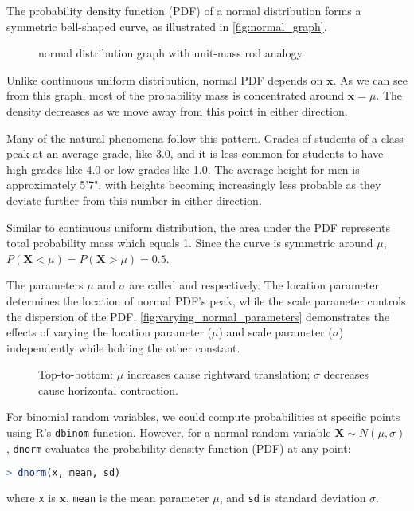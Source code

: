 The probability density function (PDF) of a normal distribution forms a symmetric bell-shaped curve, as illustrated in \autoref{fig:normal_graph}.
\begin{figure}[t]
\begin{center}
\end{center}
\caption{normal distribution graph with unit-mass rod analogy}
\label{fig:normal_graph}
\end{figure}
Unlike continuous uniform distribution, normal PDF depends on \( \bm{x} \).
As we can see from this graph, most of the probability mass is concentrated around \( \bm{x} = \mu \).
The density decreases as we move away from this point in either direction.

Many of the natural phenomena follow this pattern.
Grades of students of a class peak at an average grade, like 3.0, and it is less common for students to have high grades like 4.0 or low grades like 1.0.
The average height for men is approximately 5'7",
with heights becoming increasingly less probable as they deviate further from this number in either direction.

Similar to continuous uniform distribution, the area under the PDF represents total probability mass which equals 1.
Since the curve is symmetric around \( \mu \), \( P(\bm{X} < \mu) = P(\bm{X} > \mu) = 0.5 \).

The parameters \( \mu \) and \( \sigma \) are called  and  respectively.
The location parameter determines the location of normal PDF's peak, while the scale parameter controls the dispersion of the PDF.
\autoref{fig:varying_normal_parameters} demonstrates the effects of varying the location parameter (\( \mu \)) and scale parameter (\( \sigma \)) independently while holding the other constant.
\begin{figure}[t]
\begin{center}
\end{center}
\caption{Top-to-bottom: \( \mu \) increases cause rightward translation; \( \sigma \) decreases cause horizontal contraction.}
\label{fig:varying_normal_parameters}
\end{figure}
For binomial random variables, we could compute probabilities at specific points using R's \verb|dbinom| function.
However, for a normal random variable \( \bm{X} \sim N(\mu, \sigma) \),
\verb|dnorm| evaluates the probability density function (PDF) at any point:
\begin{lstlisting}[language=R]
> dnorm(x, mean, sd)
\end{lstlisting}
where \verb|x| is \( \bm{x} \), \verb|mean| is the mean parameter \( \mu \), and \verb|sd| is standard deviation \( \sigma \).

